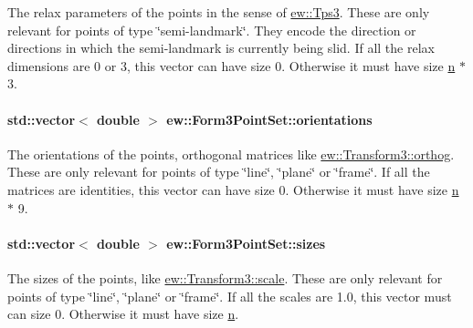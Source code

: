 \label{classew_1_1Form3PointSet_afd8ff3e67234c11b1ad3c66f1cccfb67}
The relax parameters of the points in the sense of \hyperlink{classew_1_1Tps3}{ew::Tps3}. These are only relevant for points of type \char`\"{}semi-\/landmark\char`\"{}. They encode the direction or directions in which the semi-\/landmark is currently being slid. If all the relax dimensions are 0 or 3, this vector can have size 0. Otherwise it must have size \hyperlink{classew_1_1Form3PointSet_a5bebf378e3fa2c68be2c002e216e9302}{n} $\ast$ 3. \hypertarget{classew_1_1Form3PointSet_a48ab1e4e6d0b2a057bd6e2987c6cc488}{
\paragraph[{orientations}]{\setlength{\rightskip}{0pt plus 5cm}std::vector$<$ double $>$ {\bf ew::Form3PointSet::orientations}}\hfill}
\label{classew_1_1Form3PointSet_a48ab1e4e6d0b2a057bd6e2987c6cc488}
The orientations of the points, orthogonal matrices like \hyperlink{classew_1_1Transform3_abbb79dd74876557bc765a54e115c4f66}{ew::Transform3::orthog}. These are only relevant for points of type \char`\"{}line\char`\"{}, \char`\"{}plane\char`\"{} or \char`\"{}frame\char`\"{}. If all the matrices are identities, this vector can have size 0. Otherwise it must have size \hyperlink{classew_1_1Form3PointSet_a5bebf378e3fa2c68be2c002e216e9302}{n} $\ast$ 9. \hypertarget{classew_1_1Form3PointSet_abd3dfbeb887d147a08354761d5986920}{
\paragraph[{sizes}]{\setlength{\rightskip}{0pt plus 5cm}std::vector$<$ double $>$ {\bf ew::Form3PointSet::sizes}}\hfill}
\label{classew_1_1Form3PointSet_abd3dfbeb887d147a08354761d5986920}
The sizes of the points, like \hyperlink{classew_1_1Transform3_a27f775e77a4563a8f26f3131be6ed1fd}{ew::Transform3::scale}. These are only relevant for points of type \char`\"{}line\char`\"{}, \char`\"{}plane\char`\"{} or \char`\"{}frame\char`\"{}. If all the scales are 1.0, this vector must can size 0. Otherwise it must have size \hyperlink{classew_1_1Form3PointSet_a5bebf378e3fa2c68be2c002e216e9302}{n}. 